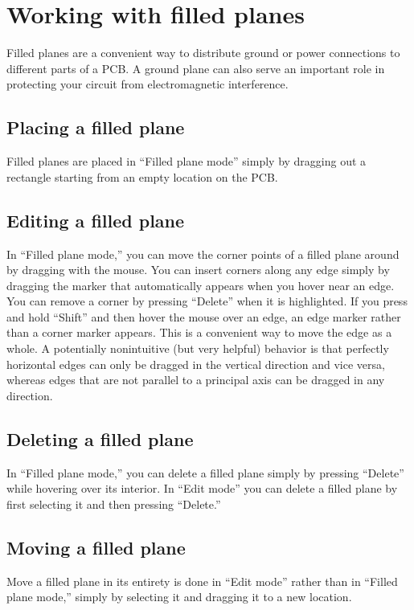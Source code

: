 \documentclass[11pt]{report}
\begin{document}
\section{Working with filled planes}

Filled planes are a convenient way to distribute ground or power
connections to different parts of a PCB. A ground plane can also serve
an important role in protecting your circuit from electromagnetic
interference.

\subsection{Placing a filled plane}

Filled planes are placed in ``Filled plane mode'' simply by dragging
out a rectangle starting from an empty location on the PCB.

\subsection{Editing a filled plane}
In ``Filled plane mode,'' you can move the corner points of a filled
plane around by dragging with the mouse. You can insert corners along
any edge simply by dragging the marker that automatically appears when
you hover near an edge. You can remove a corner by pressing ``Delete''
when it is highlighted. If you press and hold ``Shift'' and then hover the
mouse over an edge, an edge marker rather than a corner marker
appears. This is a convenient way to move the edge as a whole. A
potentially nonintuitive (but very helpful) behavior is that perfectly
horizontal edges can only be dragged in the vertical direction and
vice versa, whereas edges that are not parallel to a principal axis
can be dragged in any direction.

\subsection{Deleting a filled plane}

In ``Filled plane mode,'' you can delete a filled plane simply by
pressing ``Delete'' while hovering over its interior. In ``Edit mode''
you can delete a filled plane by first selecting it and then pressing
``Delete.''

\subsection{Moving a filled plane}

Move a filled plane in its entirety is done in ``Edit mode'' rather
than in ``Filled plane mode,'' simply by selecting it and dragging it
to a new location.
\end{document}
